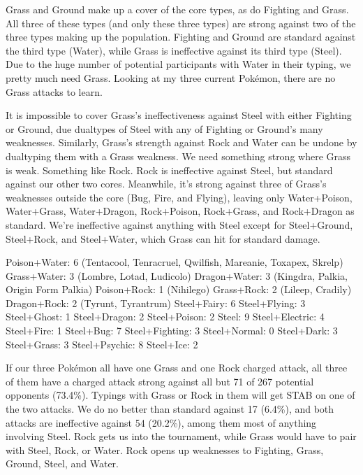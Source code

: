 Grass and Ground make up a cover of the core types, as do Fighting and Grass.
All three of these types (and only these three types) are strong against two of the three
  types making up the population.
Fighting and Ground are standard against the third type (Water), while Grass is ineffective
  against its third type (Steel).
Due to the huge number of potential participants with Water in their typing, we pretty
  much need Grass.
Looking at my three current Pokémon, there are no Grass attacks to learn.

It is impossible to cover Grass's ineffectiveness against Steel with either Fighting or Ground,
  due dualtypes of Steel with any of Fighting or Ground's many weaknesses.
Similarly, Grass's strength against Rock and Water can be undone by dualtyping them with a Grass weakness.
We need something strong where Grass is weak.
Something like Rock.
Rock is ineffective against Steel, but standard against our other two cores.
Meanwhile, it's strong against three of Grass's weaknesses outside the core (Bug, Fire, and Flying),
  leaving only Water+Poison, Water+Grass, Water+Dragon, Rock+Poison, Rock+Grass, and Rock+Dragon
  as standard.
We're ineffective against anything with Steel except for Steel+Ground, Steel+Rock, and Steel+Water, which
  Grass can hit for standard damage.

  Poison+Water: 6 (Tentacool, Tenracruel, Qwilfish, Mareanie, Toxapex, Skrelp)
  Grass+Water: 3 (Lombre, Lotad, Ludicolo)
  Dragon+Water: 3 (Kingdra, Palkia, Origin Form Palkia)
  Poison+Rock: 1 (Nihilego)
  Grass+Rock: 2 (Lileep, Cradily)
  Dragon+Rock: 2 (Tyrunt, Tyrantrum)
  Steel+Fairy: 6
  Steel+Flying: 3
  Steel+Ghost: 1
  Steel+Dragon: 2
  Steel+Poison: 2
  Steel: 9
  Steel+Electric: 4
  Steel+Fire: 1
  Steel+Bug: 7
  Steel+Fighting: 3
  Steel+Normal: 0
  Steel+Dark: 3
  Steel+Grass: 3
  Steel+Psychic: 8
  Steel+Ice: 2

If our three Pokémon all have one Grass and one Rock charged attack,
  all three of them have a charged attack strong against all but
  71 of 267 potential opponents (73.4\%).
Typings with Grass or Rock in them will get STAB on one of the two attacks.
We do no better than standard against 17 (6.4\%), and both attacks are
  ineffective against 54 (20.2\%), among them most of anything involving
  Steel.
Rock gets us into the tournament, while Grass would have to pair with Steel,
  Rock, or Water.
Rock opens up weaknesses to Fighting, Grass, Ground, Steel, and Water.

